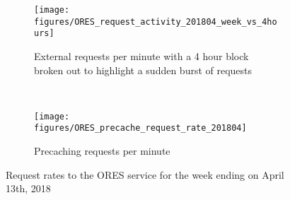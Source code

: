 \begin{figure*}[h]
\centering
\begin{subfigure}[t]{\textwidth}
  \centering
  \texttt{[image: figures/ORES\_request\_activity\_201804\_week\_vs\_4hours]}
  \caption{External requests per minute with a 4 hour block broken out to highlight a sudden burst of requests}
  \label{fig:ores_request_rate}
\end{subfigure}\\
\begin{subfigure}[t]{\columnwidth}
  \centering
  \texttt{[image: figures/ORES\_precache\_request\_rate\_201804]}
  \caption{Precaching requests per minute}
  \label{fig:ores_precache_rate}
\end{subfigure}
\caption{Request rates to the ORES service for the week ending on April 13th, 2018}
\label{fig:ores_activity}
\end{figure*}
